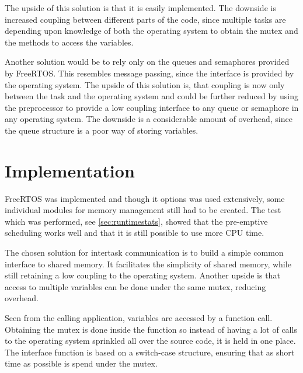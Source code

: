 The upside of this solution is that it is easily implemented. The downside is
increased coupling between different parts of the code, since multiple tasks are
depending upon knowledge of both the operating system to obtain the mutex and
the methods to access the variables.


Another solution would be to rely only on the queues and semaphores provided by
FreeRTOS. This resembles message passing, since the interface is provided by the
operating system. The upside of this solution is, that coupling is now only
between the task and the operating system and could be further reduced by using
the preprocessor to provide a low coupling interface to any queue or semaphore
in any operating system. The downside is a considerable amount of overhead,
since the queue structure is a poor way of storing variables.


\section{Implementation}
FreeRTOS was implemented and though it options was used extensively,
 some individual modules for memory management still had to be created. 
 The test which was performed, see \ref{sec:runtimestats}, showed that the pre-emptive
 scheduling works well and that it is still possible to use more CPU time. 


The chosen solution for intertask communication is to build a simple common interface to shared memory. It
facilitates the simplicity of shared memory, while still retaining a low
coupling to the operating system. Another upside is that access to multiple
variables can be done under the same mutex, reducing overhead.


Seen from the calling application, variables are accessed by a function call.
Obtaining the mutex is done inside the function so instead of having a lot of
calls to the operating system sprinkled all over the source code, it is held in
one place. The interface function is based on a switch-case structure, ensuring
that as short time as possible is spend under the mutex.